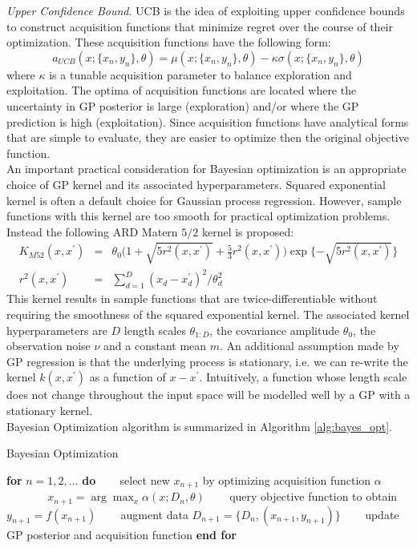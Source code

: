 \textit{Upper Confidence Bound}. UCB is the idea of exploiting upper confidence bounds to construct acquisition functions that minimize regret over the course of their optimization. These acquisition functions have the following form:
\begin{equation}
    a_{UCB}(x;\{x_n,y_n\},\theta) = \mu(x;\{x_n,y_n\},\theta) - \kappa \sigma(x;\{x_n,y_n\},\theta)
\end{equation}
where $\kappa$ is a tunable acquisition parameter to balance exploration and exploitation. The optima of acquisition functions are located where the uncertainty in GP posterior is large (exploration) and/or where the GP prediction is high (exploitation). Since acquisition functions have analytical forms that are simple to evaluate, they are easier to optimize then the original objective function.\\

An important practical consideration for Bayesian optimization is an appropriate choice of GP kernel and its associated hyperparameters. Squared exponential kernel is often a default choice for Gaussian process regression. However, sample functions with this kernel are too smooth for practical optimization problems. Instead the following ARD Matern $5/2$ kernel is proposed:
\begin{eqnarray}
    K_{M52}(x,x^{\prime}) &=& \theta_0\bigg(1+\sqrt{5r^2(x,x^{\prime})}+\frac{5}{3}r^2(x,x^{\prime}) \bigg)\exp \{-\sqrt{5r^2(x,x^{\prime})}\}\\
    r^2(x,x^{\prime}) &=& \sum_{d=1}^{D}(x_d - x^{\prime}_d)^{2}/\theta_{d}^{2}
\end{eqnarray}
This kernel results in sample functions that are twice-differentiable without requiring the smoothness of the squared exponential kernel. The associated kernel hyperparameters are $D$ length scales $\theta_{1:D}$, the covariance amplitude $\theta_0$, the observation noise $\nu$ and a constant mean $m$. An additional assumption made by GP regression is that the underlying process is stationary, i.e. we can re-write the kernel $k(x,x^{\prime})$ as a function of $x-x^{\prime}$. Intuitively, a function whose length scale does not change throughout the input space will be modelled well by a GP with a stationary kernel.\\ 

Bayesian Optimization algorithm is summarized in Algorithm \ref{alg:bayes_opt}.
\begin{algorithm}
\caption{Bayesian Optimization}
\label{alg:bayes_opt}
\begin{algorithmic}[1]
\STATE \textbf{for} $n=1,2,...$ \textbf{do}
\STATE ~~~ select new $x_{n+1}$ by optimizing acquisition function $\alpha$\\
~~~ ~~~ $x_{n+1} = \arg \max_x \alpha(x;D_n,\theta)$
\STATE ~~~ query objective function to obtain $y_{n+1} = f(x_{n+1})$
\STATE ~~~ augment data $D_{n+1} = \{D_n,(x_{n+1},y_{n+1})\}$
\STATE ~~~ update GP posterior and acquisition function 
\STATE \textbf{end for}  
\end{algorithmic}
\end{algorithm}


